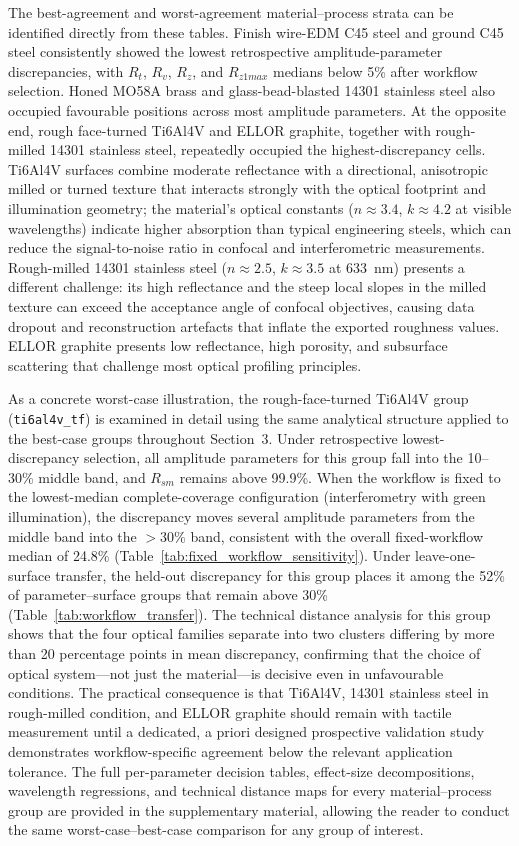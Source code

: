 \documentclass{article}
\begin{document}
The best-agreement and worst-agreement material--process strata can be identified directly from these tables. Finish wire-EDM C45 steel and ground C45 steel consistently showed the lowest retrospective amplitude-parameter discrepancies, with $R_t$, $R_v$, $R_z$, and $R_{z1max}$ medians below 5\% after workflow selection. Honed MO58A brass and glass-bead-blasted 14301 stainless steel also occupied favourable positions across most amplitude parameters. At the opposite end, rough face-turned Ti6Al4V and ELLOR graphite, together with rough-milled 14301 stainless steel, repeatedly occupied the highest-discrepancy cells. Ti6Al4V surfaces combine moderate reflectance with a directional, anisotropic milled or turned texture that interacts strongly with the optical footprint and illumination geometry; the material's optical constants ($n \approx 3.4$, $k \approx 4.2$ at visible wavelengths) indicate higher absorption than typical engineering steels, which can reduce the signal-to-noise ratio in confocal and interferometric measurements. Rough-milled 14301 stainless steel ($n \approx 2.5$, $k \approx 3.5$ at 633~nm) presents a different challenge: its high reflectance and the steep local slopes in the milled texture can exceed the acceptance angle of confocal objectives, causing data dropout and reconstruction artefacts that inflate the exported roughness values. ELLOR graphite presents low reflectance, high porosity, and subsurface scattering that challenge most optical profiling principles. 

As a concrete worst-case illustration, the rough-face-turned Ti6Al4V group (\texttt{ti6al4v\_tf}) is examined in detail using the same analytical structure applied to the best-case groups throughout Section~3. Under retrospective lowest-discrepancy selection, all amplitude parameters for this group fall into the 10--30\% middle band, and $R_{sm}$ remains above 99.9\%. When the workflow is fixed to the lowest-median complete-coverage configuration (interferometry with green illumination), the discrepancy moves several amplitude parameters from the middle band into the $>$30\% band, consistent with the overall fixed-workflow median of 24.8\% (Table~\ref{tab:fixed_workflow_sensitivity}). Under leave-one-surface transfer, the held-out discrepancy for this group places it among the 52\% of parameter--surface groups that remain above 30\% (Table~\ref{tab:workflow_transfer}). The technical distance analysis for this group shows that the four optical families separate into two clusters differing by more than 20 percentage points in mean discrepancy, confirming that the choice of optical system---not just the material---is decisive even in unfavourable conditions. The practical consequence is that Ti6Al4V, 14301 stainless steel in rough-milled condition, and ELLOR graphite should remain with tactile measurement until a dedicated, a priori designed prospective validation study demonstrates workflow-specific agreement below the relevant application tolerance. The full per-parameter decision tables, effect-size decompositions, wavelength regressions, and technical distance maps for every material--process group are provided in the supplementary material, allowing the reader to conduct the same worst-case--best-case comparison for any group of interest.
\end{document}
